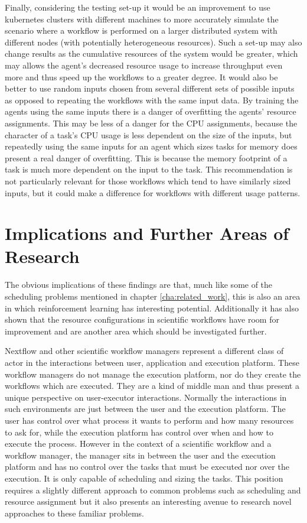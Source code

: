 Finally, considering the testing set-up it would be an improvement to use kubernetes clusters with different machines to more accurately simulate the scenario where a workflow is performed on a larger distributed system with different nodes (with potentially heterogeneous resources). Such a set-up may also change results as the cumulative resources of the system would be greater, which may allows the agent’s decreased resource usage to increase throughput even more and thus speed up the workflows to a greater degree. It would also be better to use random inputs chosen from several different sets of possible inputs as opposed to repeating the workflows with the same input data. By training the agents using the same inputs there is a danger of overfitting the agents’ resource assignments. This may be less of a danger for the CPU assignments, because the character of a task’s CPU usage is less dependent on the size of the inputs, but repeatedly using the same inputs for an agent which sizes tasks for memory does present a real danger of overfitting. This is because the memory footprint of a task is much more dependent on the input to the task. This recommendation is not particularly relevant for those workflows which tend to have similarly sized inputs, but it could make a difference for workflows with different usage patterns.

\section{Implications and Further Areas of Research}
\label{sec:implications}

The obvious implications of these findings are that, much like some of the scheduling problems mentioned in chapter \ref{cha:related_work}, this is also an area in which reinforcement learning has interesting potential. Additionally it has also shown that the resource configurations in scientific workflows have room for improvement and are another area which should be investigated further.

Nextflow and other scientific workflow managers represent a different class of actor in the interactions between user, application and execution platform. These workflow managers do not manage the execution platform, nor do they create the workflows which are executed. They are a kind of middle man and thus present a unique perspective on user-executor interactions. Normally the interactions in such environments are just between the user and the execution platform. The user has control over what process it wants to perform and how many resources to ask for, while the execution platform has control over when and how to execute the process. However in the context of a scientific workflow and a workflow manager, the manager sits in between the user and the execution platform and has no control over the tasks that must be executed nor over the execution. It is only capable of scheduling and sizing the tasks. This position requires a slightly different approach to common problems such as scheduling and resource assignment but it also presents an interesting avenue to research novel approaches to these familiar problems.

